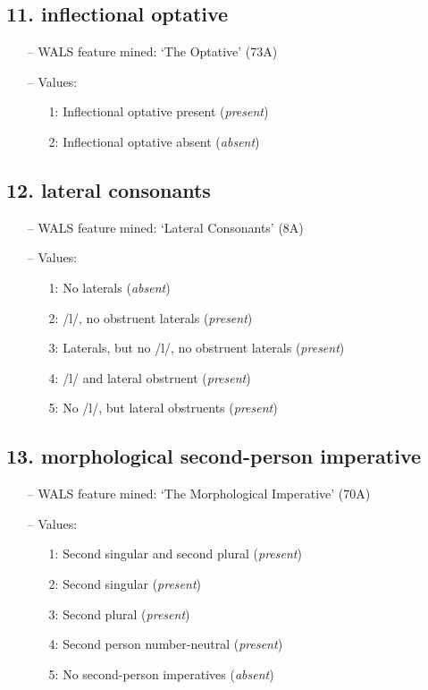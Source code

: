 \subsection*{11. inflectional optative}

\begin{itemize}
\item[--] WALS feature mined: `The Optative' (73A)
\item[--] Values:

\begin{enumerate}
\item[1:] Inflectional optative present (\emph{present})
\item[2:] Inflectional optative absent (\emph{absent})
\end{enumerate}
\end{itemize}

\subsection*{12. lateral consonants}

\begin{itemize}
\item[--] WALS feature mined: `Lateral Consonants' (8A)
\item[--] Values:

\begin{enumerate}
\item[1:] No laterals (\emph{absent})
\item[2:] /l/, no obstruent laterals (\emph{present})
\item[3:] Laterals, but no /l/, no obstruent laterals (\emph{present})
\item[4:] /l/ and lateral obstruent (\emph{present})
\item[5:] No /l/, but lateral obstruents (\emph{present})
\end{enumerate}
\end{itemize}

\subsection*{13. morphological second-person imperative}

\begin{itemize}
\item[--] WALS feature mined: `The Morphological Imperative' (70A)
\item[--] Values:

\begin{enumerate}
\item[1:] Second singular and second plural (\emph{present})
\item[2:] Second singular (\emph{present})
\item[3:] Second plural (\emph{present})
\item[4:] Second person number-neutral (\emph{present})
\item[5:] No second-person imperatives (\emph{absent})
\end{enumerate}
\end{itemize}

